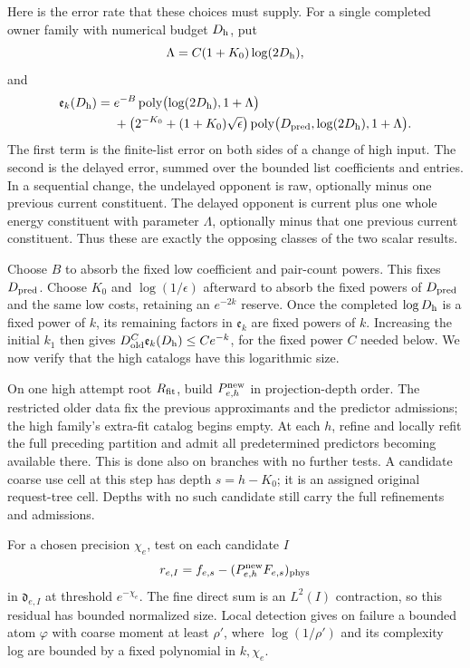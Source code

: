 Here is the error rate that these choices must supply.  For a single
completed owner family with numerical budget \(D_{\rm h}\), put
\[
 \Lambda=C(1+K_0)\log(2D_{\rm h}),
\]
and
\[
 \begin{aligned}
 \mathfrak e_k(D_{\rm h})={}&
 e^{-B}\operatorname{poly}\bigl(\log(2D_{\rm h}),1+\Lambda\bigr)\\
 &+\bigl(2^{-K_0}+(1+K_0)\sqrt\epsilon\bigr)
       \operatorname{poly}
          \bigl(D_{\rm pred},\log(2D_{\rm h}),1+\Lambda\bigr).
 \end{aligned}
\]
The first term is the finite-list error on both sides of a change
of high input.  The second is the delayed error, summed over the
bounded list coefficients and entries.  In a sequential change,
the undelayed opponent is raw, optionally minus one previous current
constituent.
The delayed opponent is current plus one whole energy constituent with
parameter \(\Lambda\), optionally minus that one previous current
constituent.  Thus these are exactly the opposing classes of the two
scalar results.

Choose \(B\) to absorb the fixed low coefficient and pair-count
powers.  This fixes \(D_{\rm pred}\).  Choose \(K_0\) and
\(\log(1/\epsilon)\) afterward to absorb the fixed powers of
\(D_{\rm pred}\) and the same low costs, retaining an \(e^{-2k}\)
reserve.  Once the completed \(\log D_{\rm h}\) is a fixed power
of \(k\), its remaining factors in \(\mathfrak e_k\) are fixed
powers of \(k\).  Increasing the initial \(k_1\) then gives
\(D_{\rm old}^C\mathfrak e_k(D_{\rm h})\le Ce^{-k}\), for the fixed
power \(C\) needed below.  We now verify that the high catalogs
have this logarithmic size.

On one high attempt root \(R_{\rm fit}\), build
\(P^{\rm new}_{e,h}\) in projection-depth order.  The restricted
older data fix the previous approximants and the predictor admissions;
the high family's extra-fit catalog begins empty.  At each \(h\),
refine and locally refit the full preceding partition and admit all
predetermined predictors becoming available there.  This is done
also on branches with no further tests.  A candidate coarse use
cell at this step has depth \(s=h-K_0\); it is an assigned original
request-tree cell.  Depths with no such candidate still carry the
full refinements and admissions.

For a chosen precision \(\chi_e\), test on each candidate \(I\)
\[
 r_{e,I}=f_{e,s}-(P^{\rm new}_{e,h}F_{e,s})_{\rm phys}
\]
in \(\mathfrak d_{e,I}\) at threshold \(e^{-\chi_e}\).
The fine direct sum is an \(L^2(I)\) contraction, so this residual
has bounded normalized size.  Local detection gives on failure a
bounded atom \(\varphi\) with coarse moment at least \(\rho'\),
where \(\log(1/\rho')\) and its complexity log are bounded by a
fixed polynomial in \(k,\chi_e\).

